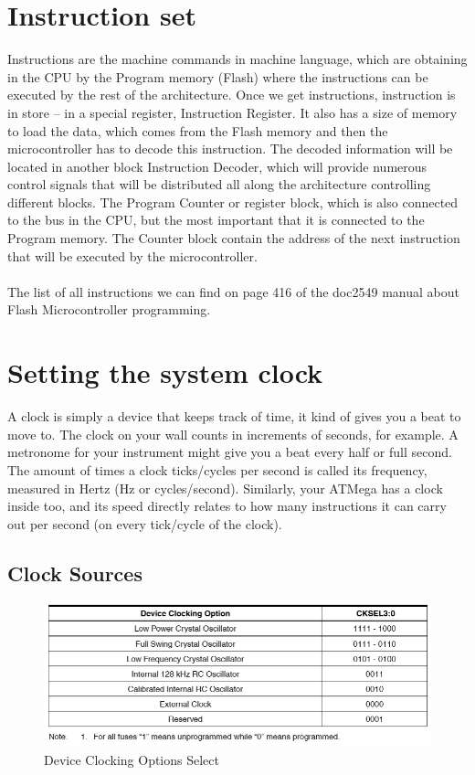 \documentclass[english]{article}
\begin{document}
\section{Instruction set}
Instructions are the machine commands in machine language, which are obtaining in the CPU by the Program memory (Flash) where the instructions can be executed by the rest of the architecture. Once we get instructions, instruction is in store – in a special register, Instruction Register. It also has a size of memory to load the data, which comes from the Flash memory and then the microcontroller has to decode this instruction. The decoded information will be located in another block Instruction Decoder, which will provide numerous control signals that will be distributed all along the architecture controlling different blocks. The Program Counter or register block, which is also connected to the bus in the CPU, but the most important that it is connected to the Program memory. The Counter block contain the address of the next instruction that will be executed by the microcontroller.\\\\
The list of all instructions we can find on page 416 of the doc2549 manual about Flash Microcontroller programming.
\section{Setting the system clock}

A clock is simply a device that keeps track of time, it kind of gives you a beat to move to. The clock on your wall counts in increments of seconds, for example. A metronome for your instrument might give you a beat every half or full second. The amount of times a clock ticks/cycles per second is called its frequency, measured in Hertz (Hz or cycles/second). Similarly, your ATMega has a clock inside too, and its speed directly relates to how many instructions it can carry out per second (on every tick/cycle of the clock). 
\subsection{Clock Sources}
\begin{figure}[H]
\caption{Device Clocking Options Select}
\centerline{\includegraphics[scale=0.8]{MicroLab1/41p}}
\end{figure}
\end{document}
